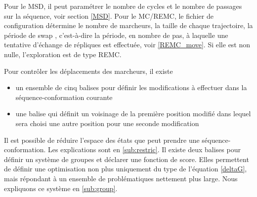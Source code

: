 Pour le MSD, il peut paramétrer le nombre de cycles et le nombre de passages sur la séquence, voir section \vref{MSD}.
Pour le MC/REMC, le fichier de configuration détermine le nombre de marcheurs, la taille de chaque trajectoire, la période de \og swap \fg, c'est-à-dire la période, en nombre de pas, à laquelle une tentative d'échange de répliques est effectuée, voir \vref{REMC_move}. Si elle est non nulle, l'exploration est de type REMC.

Pour contrôler les déplacements des marcheurs, il existe 
\begin{itemize}
\item un ensemble de cinq  balises pour définir les modifications à effectuer dans la séquence-conformation courante
\item une balise qui définit un voisinage de la première position modifié dans lequel sera choisi une autre position pour une seconde modification
\end{itemize}
Il est possible de réduire l'espace des états que peut prendre une séquence-conformation. Les explications sont en \ref{sub:restric}.  Il existe deux balises pour définir un système de groupes et déclarer une fonction de score. Elles permettent de définir une optimisation non plus uniquement du type de l'équation \ref{deltaG}, mais répondant à un ensemble de problématiques nettement plus large. Nous expliquons ce système en \vref{sub:group}.


